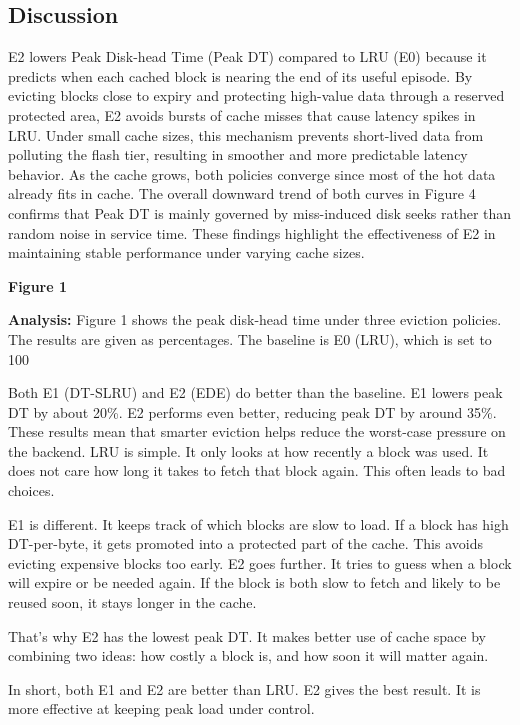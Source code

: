 \subsection{Discussion}

E2 lowers Peak Disk-head Time (Peak DT) compared to LRU (E0) because it predicts when each cached block is nearing the end of its useful episode. By evicting blocks close to expiry and protecting high-value data through a reserved protected area, E2 avoids bursts of cache misses that cause latency spikes in LRU. Under small cache sizes, this mechanism prevents short-lived data from polluting the flash tier, resulting in smoother and more predictable latency behavior. As the cache grows, both policies converge since most of the hot data already fits in cache. The overall downward trend of both curves in Figure 4 confirms that Peak DT is mainly governed by miss-induced disk seeks rather than random noise in service time. These findings highlight the effectiveness of E2 in maintaining stable performance under varying cache sizes.

\textbf{Figure 1}

\textbf{Analysis:}
Figure 1 shows the peak disk-head time under three eviction policies. The results are given as percentages. The baseline is E0 (LRU), which is set to 100%

Both E1 (DT-SLRU) and E2 (EDE) do better than the baseline. E1 lowers peak DT by about 20\%. E2 performs even better, reducing peak DT by around 35\%. These results mean that smarter eviction helps reduce the worst-case pressure on the backend. LRU is simple. It only looks at how recently a block was used. It does not care how long it takes to fetch that block again. This often leads to bad choices.

E1 is different. It keeps track of which blocks are slow to load. If a block has high DT-per-byte, it gets promoted into a protected part of the cache. This avoids evicting expensive blocks too early. E2 goes further. It tries to guess when a block will expire or be needed again. If the block is both slow to fetch and likely to be reused soon, it stays longer in the cache.

That’s why E2 has the lowest peak DT. It makes better use of cache space by combining two ideas: how costly a block is, and how soon it will matter again.

In short, both E1 and E2 are better than LRU. E2 gives the best result. It is more effective at keeping peak load under control.


